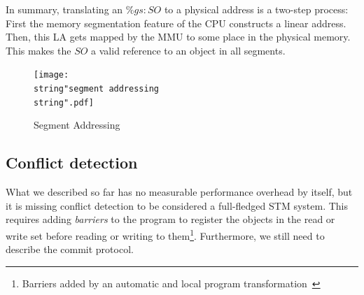 \documentclass{sigplanconf}
\begin{document}
In summary, translating an $\%gs:SO$ to a physical address is a
two-step process: First the memory segmentation feature of the CPU
constructs a linear address. Then, this LA gets mapped by the MMU to
some place in the physical memory. This makes the $SO$ a valid reference
to an object in all segments.



\begin{figure}[t]
  \centering
  \texttt{[image: \\string"segment addressing\\string".pdf]}
  \caption{Segment Addressing\label{fig:Segment-Addressing}}
\end{figure}


\subsection{Conflict detection}

What we described so far has no measurable performance overhead by
itself, but it is missing conflict detection to be considered a
full-fledged STM system.  This requires adding \emph{barriers} to the
program to register the objects in the read or write set before
reading or writing to them\footnote{Barriers added by an automatic and
local program transformation~\cite{felber07}}.  Furthermore, we still
need to describe the commit protocol.
\end{document}
